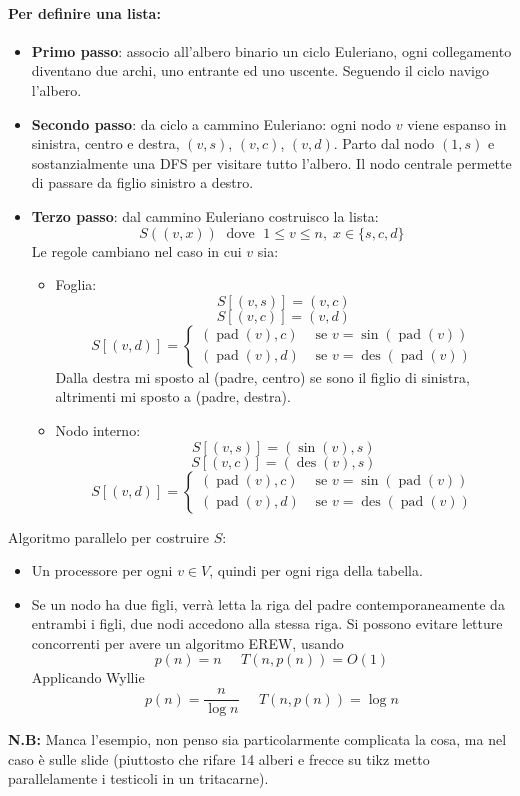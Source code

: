 \documentclass[11pt]{article}
\DeclareMathOperator{\des}{des}
\DeclareMathOperator{\pad}{pad}
\begin{document}
	\paragraph{Per definire una lista: }
	\begin{itemize}
		\item \textbf{Primo passo}: associo all'albero binario un ciclo Euleriano, ogni collegamento diventano due archi, uno entrante ed uno uscente. Seguendo il ciclo navigo l'albero.\\
		
		\item \textbf{Secondo passo}: da ciclo a cammino Euleriano: ogni nodo $v$ viene espanso in sinistra, centro e destra, $(v,s)$, $(v,c)$, $(v,d)$. Parto dal nodo $(1,s)$ e sostanzialmente una DFS per visitare tutto l'albero. Il nodo centrale permette di passare da figlio sinistro a destro.\\
		
		\newpage
		
		\item \textbf{Terzo passo}: dal cammino Euleriano costruisco la lista: 
		$$ S ((v, x)) \; \text{ dove } \; 1 \leq v \leq n, \; x \in \{s,c,d\}$$
		Le regole cambiano nel caso in cui $v$ sia:
		\begin{itemize}
			\item Foglia:
			$$ S [(v, s)] = (v,c) $$
			$$ S [(v, c)] = (v,d) $$
			$$ S [(v, d)] = \begin{cases} 
				(\pad(v), c) & \text{ se } v = \sin (\pad(v)) \\
				(\pad(v), d) & \text{ se } v = \des (\pad (v))
				\end {cases}$$
			Dalla destra mi sposto al (padre, centro) se sono il figlio di sinistra, altrimenti mi sposto a (padre, destra).
				
			\item Nodo interno:
				$$ S [(v, s)] = (\sin(v),s) $$
				$$ S [(v, c)] = (\des(v),s) $$
				$$ S [(v, d)] = 
				\begin{cases} 
					(\pad(v), c) & \text{ se } v = \sin (\pad(v)) \\
					(\pad(v), d) & \text{ se } v = \des (\pad (v))
				\end{cases}
				$$
		\end{itemize}
	\end{itemize}
	
	Algoritmo parallelo per costruire $S$:
	\begin{itemize}
		\item Un processore per ogni $v \in V$, quindi per ogni riga della tabella.\\
		
		\item Se un nodo ha due figli, verrà letta la riga del padre contemporaneamente da entrambi i figli, due nodi accedono alla stessa riga. Si possono evitare letture concorrenti per avere un algoritmo EREW, usando 
		$$ p(n) = n \;\;\;\;\; T(n, p(n)) = O(1) $$
		Applicando Wyllie
		$$ p(n) = \frac{n}{\log n} \;\;\;\;\; T(n, p(n)) = \log n $$
	\end{itemize}
	
	\vfill 
	
	\textbf{N.B:} Manca l'esempio, non penso sia particolarmente complicata la cosa, ma nel caso è sulle slide (piuttosto che rifare 14 alberi e frecce su tikz metto parallelamente i testicoli in un tritacarne).\\
	
	\newpage
	
	
	
\end{document}

